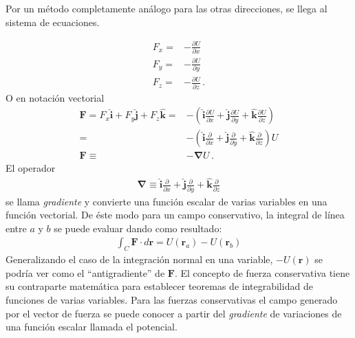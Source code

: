 Por un método completamente análogo para las otras direcciones, se llega al sistema de ecuaciones. 

\begin{align}
  F_x=& -\frac{\partial U}{\partial x}\nonumber\\
   F_y=& -\frac{\partial U}{\partial y}\nonumber\\
   F_z=& -\frac{\partial U}{\partial z}\,.
\end{align}
O en notación vectorial
\begin{align}
 \mathbf{F}=F_x\hat{\mathbf{i}}+F_y\hat{\mathbf{j}}+F_z\hat{\mathbf{k}}
=&-\left(\hat{\mathbf{i}}\frac{\partial U}{\partial x}
+\hat{\mathbf{j}}\frac{\partial U}{\partial y}
+\hat{\mathbf{k}}\frac{\partial U}{\partial z}\right)\nonumber\\
=&-\left(\hat{\mathbf{i}}\frac{\partial }{\partial x}
+\hat{\mathbf{j}}\frac{\partial }{\partial y}
+\hat{\mathbf{k}}\frac{\partial }{\partial z}
\right)U\nonumber\\
\mathbf{F}\equiv& -\boldsymbol{\nabla}U\,.
\end{align}
El operador
\begin{align}
\boldsymbol{\nabla}\equiv \hat{\mathbf{i}}\frac{\partial }{\partial x}
+\hat{\mathbf{j}}\frac{\partial }{\partial y}
+\hat{\mathbf{k}}\frac{\partial }{\partial z}
\end{align}
se llama \emph{gradiente} y convierte una función escalar de varias variables en una función vectorial. De éste modo para un campo conservativo, la integral de línea entre $a$ y $b$ se puede evaluar dando como resultado:
\begin{align}
  \int_C\mathbf{F}\cdot d\mathbf{r}=U(\mathbf{r}_a)-U(\mathbf{r}_b)
\end{align}
Generalizando el caso de la integración normal en una variable,
$-U(\mathbf{r})$ se podría ver como el ``antigradiente'' de
$\mathbf{F}$. El concepto de fuerza conservativa tiene su contraparte
matemática para establecer teoremas de integrabilidad de funciones de
varias variables. Para las fuerzas conservativas el campo generado por
el vector de fuerza se puede conocer a partir del \emph{gradiente} de
variaciones de una función escalar llamada el potencial.

